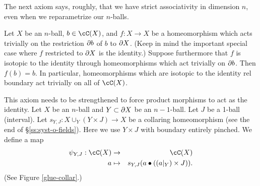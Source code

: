 The next axiom says, roughly, that we have strict associativity in dimension $n$, 
even when we reparametrize our $n$-balls.

\begin{axiom}
Let $X$ be an $n$-ball, $b \in \cC(X)$, and $f: X\to X$ be a homeomorphism which 
acts trivially on the restriction $\partial b$ of $b$ to $\partial X$.
(Keep in mind the important special case where $f$ restricted to $\partial X$ is the identity.)
Suppose furthermore that $f$ is isotopic to the identity through homeomorphisms which act
trivially on $\partial b$.
Then $f(b) = b$.
In particular, homeomorphisms which are isotopic to the identity rel boundary act trivially on 
all of $\cC(X)$.
\end{axiom}

This axiom needs to be strengthened to force product morphisms to act as the identity.
Let $X$ be an $n$-ball and $Y\subset\partial X$ be an $n{-}1$-ball.
Let $J$ be a 1-ball (interval).
Let $s_{Y,J}: X\cup_Y (Y\times J) \to X$ be a collaring homeomorphism
(see the end of \S\ref{ss:syst-o-fields}).
Here we use $Y\times J$ with boundary entirely pinched.
We define a map
\begin{eqnarray*}
	\psi_{Y,J}: \cC(X) &\to& \cC(X) \\
	a & \mapsto & s_{Y,J}(a \bullet ((a|_Y)\times J)) .
\end{eqnarray*}
(See Figure \ref{glue-collar}.)
